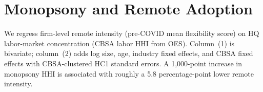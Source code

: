 \section*{Monopsony and Remote Adoption}
We regress firm-level remote intensity (pre-COVID mean flexibility score) on HQ labor-market concentration (CBSA labor HHI from OES). Column~(1) is bivariate; column~(2) adds log size, age, industry fixed effects, and CBSA fixed effects with CBSA-clustered HC1 standard errors. A 1{,}000-point increase in monopsony HHI is associated with roughly a 5.8 percentage-point lower remote intensity.

\begin{table}[H]
  \centering
  
\end{table}
